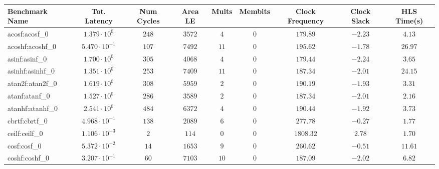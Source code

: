 \begin{tabular}{|l|c|c|c|c|c|c|c|c|}
\hline
Benchmark Name               & Tot. Latency            & Num Cycles & Area LE    & Mults   & Membits & Clock Frequency & Clock Slack & HLS Time(s) \\
\hline
acosf:acosf\_0               & $ 1.379 \cdot 10^{0}  $ & $ 248    $ & $ 3572   $ & $ 4   $ & $ 0   $ & $ 179.89      $ & $ -2.23   $ & $ 4.13    $ \\
acoshf:acoshf\_0             & $ 5.470 \cdot 10^{-1} $ & $ 107    $ & $ 7492   $ & $ 11  $ & $ 0   $ & $ 195.62      $ & $ -1.78   $ & $ 26.97   $ \\
asinf:asinf\_0               & $ 1.700 \cdot 10^{0}  $ & $ 305    $ & $ 4068   $ & $ 4   $ & $ 0   $ & $ 179.44      $ & $ -2.24   $ & $ 3.65    $ \\
asinhf:asinhf\_0             & $ 1.351 \cdot 10^{0}  $ & $ 253    $ & $ 7409   $ & $ 11  $ & $ 0   $ & $ 187.34      $ & $ -2.01   $ & $ 24.15   $ \\
atan2f:atan2f\_0             & $ 1.619 \cdot 10^{0}  $ & $ 308    $ & $ 5959   $ & $ 2   $ & $ 0   $ & $ 190.19      $ & $ -1.93   $ & $ 3.31    $ \\
atanf:atanf\_0               & $ 1.527 \cdot 10^{0}  $ & $ 286    $ & $ 3589   $ & $ 2   $ & $ 0   $ & $ 187.34      $ & $ -2.01   $ & $ 2.16    $ \\
atanhf:atanhf\_0             & $ 2.541 \cdot 10^{0}  $ & $ 484    $ & $ 6372   $ & $ 4   $ & $ 0   $ & $ 190.44      $ & $ -1.92   $ & $ 3.73    $ \\
cbrtf:cbrtf\_0               & $ 4.968 \cdot 10^{-1} $ & $ 138    $ & $ 2089   $ & $ 6   $ & $ 0   $ & $ 277.78      $ & $ -0.27   $ & $ 1.77    $ \\
ceilf:ceilf\_0               & $ 1.106 \cdot 10^{-3} $ & $ 2      $ & $ 114    $ & $ 0   $ & $ 0   $ & $ 1808.32     $ & $ 2.78    $ & $ 1.70    $ \\
cosf:cosf\_0                 & $ 5.372 \cdot 10^{-2} $ & $ 14     $ & $ 1653   $ & $ 9   $ & $ 0   $ & $ 260.62      $ & $ -0.51   $ & $ 11.61   $ \\
coshf:coshf\_0               & $ 3.207 \cdot 10^{-1} $ & $ 60     $ & $ 7103   $ & $ 10  $ & $ 0   $ & $ 187.09      $ & $ -2.02   $ & $ 6.82    $ \\

\end{tabular}
